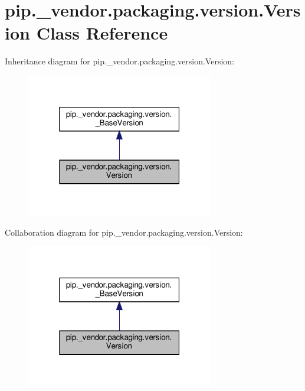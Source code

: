 \hypertarget{classpip_1_1__vendor_1_1packaging_1_1version_1_1Version}{}\section{pip.\+\_\+vendor.\+packaging.\+version.\+Version Class Reference}
\label{classpip_1_1__vendor_1_1packaging_1_1version_1_1Version}


Inheritance diagram for pip.\+\_\+vendor.\+packaging.\+version.\+Version\+:
\nopagebreak
\begin{figure}[H]
\begin{center}
\leavevmode
\includegraphics[width=232pt]{classpip_1_1__vendor_1_1packaging_1_1version_1_1Version__inherit__graph}
\end{center}
\end{figure}


Collaboration diagram for pip.\+\_\+vendor.\+packaging.\+version.\+Version\+:
\nopagebreak
\begin{figure}[H]
\begin{center}
\leavevmode
\includegraphics[width=232pt]{classpip_1_1__vendor_1_1packaging_1_1version_1_1Version__coll__graph}
\end{center}
\end{figure}
